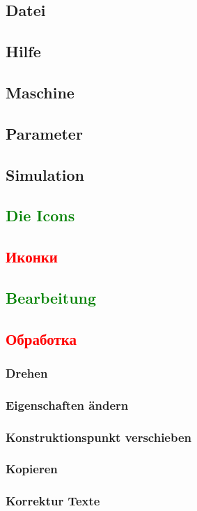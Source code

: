 \documentclass[14pt,a4paper]{book}
\newcommand{\DE}[1]{\textcolor{green}{#1}}
\newcommand{\RU}[1]{\textcolor{red}{#1}}
\begin{document}
		\subsection{Datei}
		\subsection{Hilfe}
		\subsection{Maschine}
		\subsection{Parameter}
		\subsection{Simulation}
	\DE{\section{Die Icons}}
	\RU{\section{Иконки}}
		\DE{\subsection{Bearbeitung}}
		\RU{\subsection{Обработка}}
			\subsubsection{Drehen}
			\subsubsection{Eigenschaften ändern}
			\subsubsection{Konstruktionspunkt verschieben}
			\subsubsection{Kopieren}
			\subsubsection{Korrektur Texte}
\end{document}
